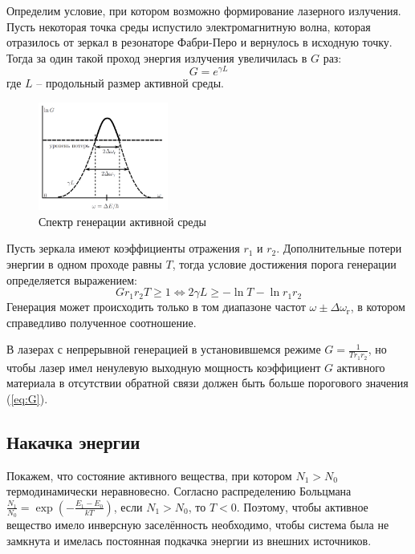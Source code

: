 Определим условие, при котором возможно формирование лазерного излучения. Пусть 
некоторая точка среды испустило электромагнитную волна, которая отразилось от 
зеркал в резонаторе Фабри-Перо и вернулось в исходную точку. Тогда за один 
такой проход энергия излучения увеличилась в $G$ раз:
$$
G = e^{\gamma L}
$$
где $L$ -- продольный размер активной среды.

\begin{figure}
	\centering
	\includegraphics[width=0.38\textwidth]{../Изображения/Порог генерации.png}
	\caption{Спектр генерации активной среды}
	\label{img:spectr_gen}
\end{figure}

Пусть зеркала имеют коэффициенты отражения $r_1$ и $r_2$. Дополнительные потери 
энергии в одном проходе равны $T$, тогда условие достижения порога генерации 
определяется выражением:
\begin{equation}
	G r_1 r_2 T \ge 1 \Leftrightarrow 2 \gamma L \ge - \ln T - \ln r_1 r_2
	\label{eq:G}
\end{equation}
Генерация может происходить только в том диапазоне частот $\omega \pm \Delta 
\omega_г$, в котором справедливо полученное соотношение.

В лазерах с непрерывной генерацией в установившемся режиме $G = \frac{1}{T r_1 
r_2}$, но чтобы лазер имел ненулевую выходную мощность коэффициент $G$ 
активного материала в отсутствии обратной связи должен быть больше порогового 
значения (\ref{eq:G}).

\subsection*{Накачка энергии}

Покажем, что состояние активного вещества, при котором $N_1 > N_0$ 
термодинамически неравновесно. Согласно распределению Больцмана 
$\frac{N_1}{N_0} = \exp \left(- \frac{E_1 - E_0}{k T}\right)$, если $N_1 > 
N_0$, то $T < 0$. Поэтому, чтобы активное вещество имело инверсную заселённость 
необходимо, чтобы система была не замкнута и имелась постоянная подкачка 
энергии из внешних источников.

